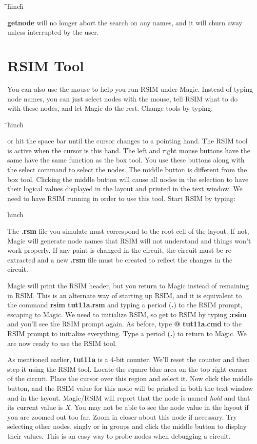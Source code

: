 \documentclass[letterpaper,twoside,12pt]{article}
\def\hinch{\hspace*{0.5in}}
\def\starti{\begin{center}\begin{tabbing}\hinch\=\hinch\=\hinch\=hinch\hinch\=\kill}
\def\endi{\end{tabbing}\end{center}}
\def\ii{\>\>\>}
\begin{document}
\starti
   \ii {\bfseries :getnode abort}
\endi

{\bfseries getnode} will no longer abort the search on any names, and it will
churn away unless interrupted by the user.

\section{RSIM Tool}

You can also use the mouse to help you run RSIM under Magic.  Instead
of typing node names, you can just select nodes with the mouse, tell
RSIM what to do with these nodes, and let Magic do the rest.  Change
tools by typing:

\starti
   \ii {\bfseries :tool rsim}
\endi

or hit the space bar until the cursor changes to a pointing hand.  The
RSIM tool is active when the cursor is this hand.  The left and
right mouse buttons have the same have the same function as the box
tool.  You use these buttons along with the select
command to select the nodes.  The middle button is 
different from the box tool.  Clicking the middle button will cause
all nodes in the selection to have their logical values displayed in the
layout and printed in the text window.
We need to 
have RSIM running in order to use this tool.  Start RSIM by typing:

\starti
   \ii {\bfseries :startrsim tut11a.rsm}
\endi

The {\bfseries .rsm} file you simulate must correspond to the root cell
of the layout.  If not, Magic will generate node names that
RSIM will not understand and things won't work properly.
If any paint is changed in the circuit,
the circuit must be re-extracted and a new {\bfseries .rsm} file must be
created to reflect the changes in the circuit.

Magic will print the RSIM header, but you return to Magic instead
of remaining in RSIM.  This is an alternate way of starting up RSIM, 
and it is
equivalent to the command {\bfseries rsim tut11a.rsm} and typing a period ({\bfseries .})
to the RSIM prompt, escaping to Magic.  We need to initialize RSIM, so
get to RSIM by typing {\bfseries :rsim} and you'll see the RSIM prompt again.
As before, type {\bfseries @ tut11a.cmd} to the RSIM prompt to initialize
everything. Type a period ({\bfseries .}) to return to Magic.  We are now
ready to use the RSIM tool.

As mentioned earlier, {\bfseries tut11a} is a 4-bit counter.  We'll reset
the counter and then step it using the RSIM tool.  Locate the square
blue area on the top right corner of the circuit.  Place the cursor over this
region and select it.  Now click the middle button, and the RSIM value
for this node will be printed in both the text window and in the
layout.  Magic/RSIM will report that the node is named {\itshape hold}
and that its current value is {\itshape X}.
You may not be able to see the node value in the layout if you
are zoomed out too far.  Zoom in closer about this node if necessary.
Try selecting other nodes, singly or in groups and click the middle
button to display their values.  This is an easy way to probe nodes 
when debugging a circuit.
\end{document}
